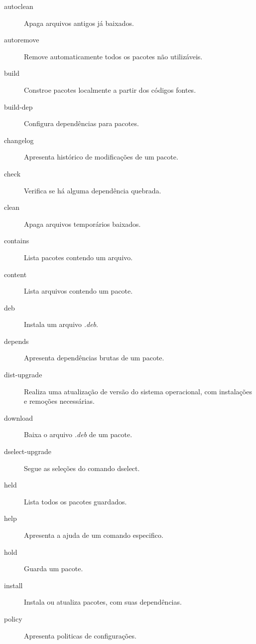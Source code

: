 \begin{description}
	\item[autoclean] Apaga arquivos antigos já baixados. %
	\item[autoremove] Remove automaticamente todos os pacotes não utilizáveis. %
	\item[build] Constroe pacotes localmente a partir dos códigos fontes. %
	\item[build-dep] Configura dependências para pacotes. %
	\item[changelog] Apresenta histórico de modificações de um pacote. %
	\item[check] Verifica se há alguma dependência quebrada. %
	\item[clean] Apaga arquivos temporários baixados. %
	\item[contains] Lista pacotes contendo um arquivo. %
	\item[content] Lista arquivos contendo um pacote. %
	\item[deb] Instala um arquivo \textit{.deb}. %
	\item[depends] Apresenta dependências brutas de um pacote. %
	\item[dist-upgrade] Realiza uma atualização de versão do sistema operacional, com instalações e remoções necessárias. %
	\item[download] Baixa o arquivo \textit{.deb} de um pacote.  %
	\item[dselect-upgrade] Segue as seleções do comando {\code dselect}. %
	\item[held] Lista todos os pacotes guardados. %
	\item[help] Apresenta a ajuda de um comando especifico. %
	\item[hold] Guarda um pacote. %
	\item[install] Instala ou atualiza pacotes, com suas dependências. %
	\item[policy] Apresenta politicas de configurações. %

\end{description}
